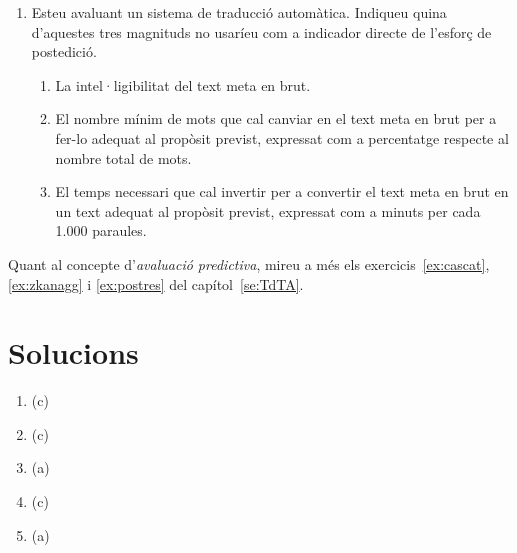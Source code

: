 \begin{enumerate}
\item Esteu avaluant un sistema de traducció automàtica. Indiqueu
  quina d'aquestes tres magnituds no usaríeu com a indicador directe
  de l'esforç de postedició.  
  \begin{enumerate}
  \item La intel·ligibilitat del text
    meta en brut.
  \item El nombre mínim de mots que cal canviar en
    el text meta en brut per a fer-lo adequat al propòsit previst,
    expressat com a percentatge respecte al nombre total de mots.
  \item El temps necessari que cal invertir per a convertir el text
    meta en brut en un text adequat al propòsit previst, expressat com
    a minuts per cada 1.000 paraules.
  \end{enumerate}
  



\end{enumerate}

Quant al concepte d'\emph{avaluació predictiva}, mireu a més els
exercicis~\ref{ex:cascat}, \ref{ex:zkanagg} i \ref{ex:postres} del capítol~\ref{se:TdTA}.


\section{Solucions}


\begin{enumerate}
\item (c)
\item (c)
\item (a)
\item (c)
\item (a)


\end{enumerate}


